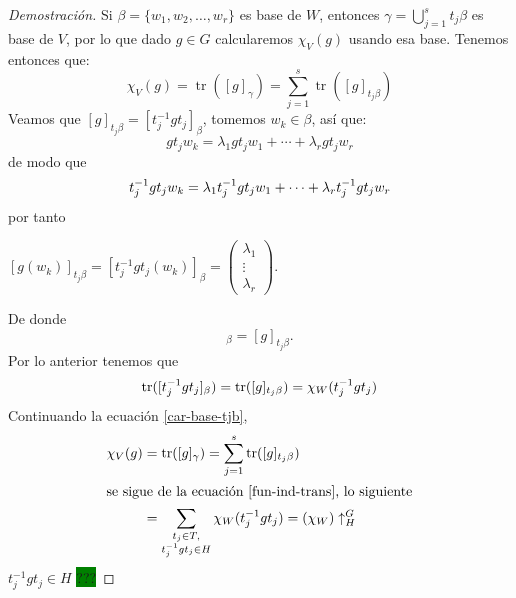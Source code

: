 \documentclass[12pt]{book}
\theoremstyle{definition}
\DeclareMathOperator{\tr}{tr}
\newcounter{in}
\begin{document}
\begin{proof}[Demostración]

  Si $\beta=\{w_{1},w_{2},\ldots,w_{r}\}$ es base de $W$, entonces $\gamma=\bigcup^{s}_{j=1}t_{j}\beta$ es
  base de $V$, por lo que dado $g\in G$ calcularemos $\chi_{V}(g)$
  usando esa base. Tenemos entonces que:
  \begin{equation}
    \label{car-base-tjb}    
    \chi_{V}(g)=\tr([g]_{\gamma})=\sum^{s}_{j=1}\tr([g]_{t_{j}\beta})
  \end{equation}
  Veamos que $[g]_{t_{j}\beta}=[t^{-1}_{j}gt_{j}]_{\beta}$, tomemos
  $w_{k}\in \beta$, así que:
  \begin{equation*}
    gt_{j}w_{k}=\lambda_{1}gt_{j}w_{1}+\cdots+\lambda_{r}gt_{j}w_{r}
  \end{equation*}
  de modo que
  \begin{equation*}
    t^{-1}_{j}gt_{j}w_{k}=\lambda_{1}t^{-1}_{j}gt_{j}w_{1}+\cdots+\lambda_{r}t^{-1}_{j}gt_{j}w_{r}\\
  \end{equation*}
  por tanto
   \begin{center}
    $[g(w_{k})]_{t_{j}\beta}=[t^{-1}_{j}gt_{j}(w_{k})]_{\beta}=\begin{pmatrix}
      \lambda_{1}  \\
      \vdots  \\
      \lambda_{r}  
    \end{pmatrix}$.
  \end{center}
  De donde
  \begin{equation*}
    [t^{-1}_{j}gt_{j}]_{\beta}=[g]_{t_{j}\beta}.
  \end{equation*}
  Por lo anterior tenemos que
  \begin{equation*}
    \tr([t^{-1}_{j}gt_{j}]_{\beta})=\tr([g]_{t_{j}\beta})=\chi_{W}(t^{-1}_{j}gt_{j})\\
  \end{equation*}
  Continuando la ecuación \ref{car-base-tjb}, 
  \begin{align*}
    \chi_{V}(g)&=\tr([g]_{\gamma})=\sum^{s}_{j=1}\tr([g]_{t_{j}\beta})\\
    \intertext{se sigue de la ecuación \ref{fun-ind-trans}, lo siguiente}
    &=\sum_{\substack{t_{j}\in T,\\t^{-1}_{j}gt_{j}\in H}}\chi_{W}(t^{-1}_{j}gt_{j})=(\chi_{W})\uparrow^{G}_{H}
  \end{align*}
  $t^{-1}_{j}gt_{j}\in H$ {\setlength{\fboxsep}{0pt}\colorbox{green}{???}}
\end{proof}
\end{document}
